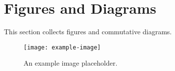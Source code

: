 \section{Figures and Diagrams}
\label{sec:figures-diagrams}

This section collects figures and commutative diagrams.

\begin{figure}[h]
  \centering
  \texttt{[image: example-image]}
  \caption{An example image placeholder.}
\end{figure}

\begin{center}
\end{center}
